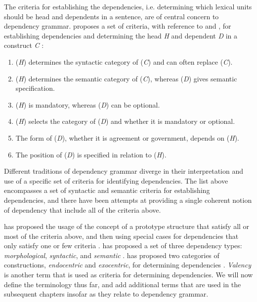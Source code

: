 The criteria for establishing the dependencies, i.e. determining which lexical units should be head and dependents in a sentence, are of central concern to dependency grammar. \citeauthor{Niv:05} proposes a set of criteria, with reference to \citeauthor{Zwicky:85} and \citeauthor{Hudson:90}, for establishing dependencies and determining the head \textit{H} and dependent \textit{D} in a construct \textit{C} \cite{Zwicky:85, Hudson:90, Niv:05}:

\begin{enumerate}
\item (\textit{H}) determines the syntactic category of (\textit{C}) and can often replace (\textit{C}).
\item (\textit{H}) determines the semantic category of (\textit{C}), whereas (\textit{D}) gives semantic specification.
\item (\textit{H}) is mandatory, whereas (\textit{D}) can be optional.
\item (\textit{H}) selects the category of (\textit{D}) and whether it is mandatory or optional.
\item The form of (\textit{D}), whether it is agreement or government, depends on (\textit{H}).
\item The position of (\textit{D}) is specified in relation to (\textit{H}).
\end{enumerate}

Different traditions of dependency grammar diverge in their interpretation and use of a specific set of criteria for identifying dependencies. The list above encompasses a set of syntactic and semantic criteria for establishing dependencies, and there have been attempts at providing a single coherent notion of dependency that include all of the criteria above. 

\citeauthor{Hudson:90} has proposed the usage of the concept of a prototype structure that satisfy all or most of the criteria above, and then using special cases for dependencies that only satisfy one or few criteria \cite{Hudson:90}. \citeauthor{Mel:88} has proposed a set of three dependency types: \textit{morphological}, \textit{syntactic}, and \textit{semantic} \cite{Mel:88}. \citeauthor{Nikula:86} has proposed two categories of constructions, \textit{endocentric} and \textit{exocentric}, for determining dependencies \cite{Nikula:86}. \textit{Valency} is another term that is used as criteria for determining dependencies. We will now define the terminology thus far, and add additional terms that are used in the subsequent chapters insofar as they relate to dependency grammar.

